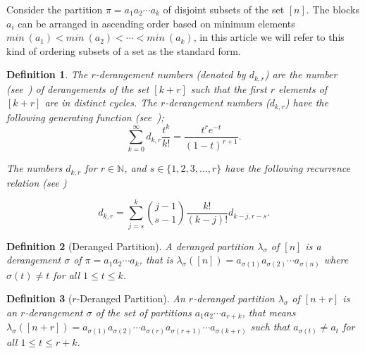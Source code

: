 \documentclass[12pt]{amsart}
\newtheorem{proof 1}{proof 1}
\newtheorem{definition}{Definition}[section]
\begin{document}
Consider the partition $\pi=a_1a_2\cdots a_k$ of disjoint subsets of the set $[n]$.  The blocks $a_i$ can be arranged in ascending order based on minimum elements $min\: (a_1)< min\: (a_2)<\cdots<min\: (a_k)$, in this article we will refer to this kind of ordering subsets of a set as the standard form. %
\begin{definition}\label{defintion:20}The $r$-derangement numbers (denoted by $d_{k,r}$)  are the number (see~\cite{wang2017r}) of derangements of the set $[k+r]$ such that the first $r$ elements of $[k+r]$ are in distinct cycles. The $r$-derangement numbers ($d_{k,r}$) have the following generating function (see~\cite{wang2017r});
	\begin{equation}\label{equation:1}
		\sum_{k=0}^{\infty}d_{k,r}\frac{t^k}{k!}=\frac{t^re^{-t}}{(1-t)^{r+1}}.
\end{equation}

The numbers $d_{k,r}$ for $r\in\mathbb{N}$, and $s\in \{1,2,3,\ldots,r\}$ have the following recurrence relation (see \cite{wang2017r})

\begin{equation}\label{equation:88}
	d_{k,r}=\sum\limits_{j=s}^{k}\binom{j-1}{s-1}\frac{k!}{(k-j)!}d_{k-j,r-s}.
\end{equation}\end{definition}

\begin{definition}[Deranged Partition\cite{belbachir2023deranged}] A deranged partition $\lambda_{\sigma}$ of $[n]$ is a derangement $\sigma$ of $\pi=a_1a_2\cdots a_k$,  that is $\lambda_{\sigma}([n])=a_{\sigma(1)}a_{\sigma(2)}\cdots a_{\sigma(n)}$ where ${\sigma(t)}\not={t}$ for all $1\leq t\leq k$.
	
\end{definition}
\begin{definition}[$r$-Deranged Partition\cite{belbachir2023deranged}] An $r$-deranged partition $\lambda_{\sigma}$ of $[n+r]$ is an $r$-derangement $\sigma$ of the set of partitions $a_1a_2\cdots a_{r+k}$,  that means\\ $\lambda_{\sigma}([n+r])=a_{\sigma(1)}a_{\sigma(2)}\cdots a_{\sigma(r)}a_{\sigma(r+1)}\cdots a_{\sigma(k+r)}$ such that $a_{\sigma(t)}\not=a_{t}$ for all $1\leq t\leq r+k$.
	
\end{definition}
\end{document}
